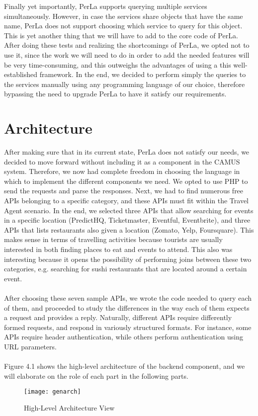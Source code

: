 Finally yet importantly, PerLa supports querying multiple services simultaneously. However, in case the services share objects that have the same name, PerLa does not support choosing which service to query for this object. This is yet another thing that we will have to add to the core code of PerLa. After doing these tests and realizing the shortcomings of PerLa, we opted not to use it, since the work we will need to do in order to add the needed features will be very time-consuming, and this outweighs the advantages of using a this well-established framework. In the end, we decided to perform simply the queries to the services manually using any programming language of our choice, therefore bypassing the need to upgrade PerLa to have it satisfy our requirements.
\newpage
\section{Architecture}
\label{sec:architecture}
After making sure that in its current state, PerLa does not satisfy our needs, we decided to move forward without including it as a component in the CAMUS system. Therefore, we now had complete freedom in choosing the language in which to implement the different components we need. We opted to use PHP to send the requests and parse the responses. Next, we had to find numerous free APIs belonging to a specific category, and these APIs must fit within the Travel Agent scenario. In the end, we selected three APIs that allow searching for events in a specific location (PredictHQ, Ticketmaster, Eventful, Eventbrite), and three APIs that lists restaurants also given a location (Zomato, Yelp, Foursquare). This makes sense in terms of travelling activities because tourists are usually interested in both finding places to eat and events to attend. This also was interesting because it opens the possibility of performing joins between these two categories, e.g. searching for sushi restaurants that are located around a certain event.\\\\
After choosing these seven sample APIs, we wrote the code needed to query each of them, and proceeded to study the differences in the way each of them expects a request and provides a reply. Naturally, different APIs require differently formed requests, and respond in variously structured formats. For instance, some APIs require header authentication, while others perform authentication using URL parameters.\\\\
Figure 4.1 shows the high-level architecture of the backend component, and we will elaborate on the role of each part in the following parts.
\newpage
\begin{figure}[h]
\centering
\texttt{[image: genarch]}
\caption{High-Level Architecture View}
\end{figure}
\newpage
